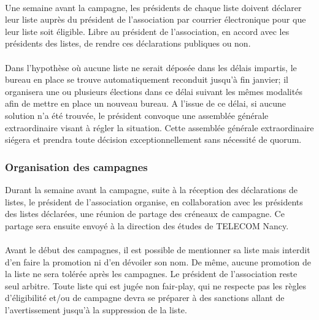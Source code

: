 \documentclass{article} %
\begin{document}
                \paragraph{}
				Une semaine avant la campagne, les présidents de chaque liste
				doivent déclarer leur liste auprès du président de l’association
				par courrier électronique pour que leur liste soit éligible.
				Libre au président de l’association, en accord avec les
				présidents des listes, de rendre ces déclarations publiques ou
				non.

                \paragraph{}
				Dans l’hypothèse où aucune liste ne serait déposée dans les
				délais impartis, le bureau en place se trouve automatiquement
				reconduit jusqu’à fin janvier; il organisera une ou plusieurs
				élections dans ce délai suivant les mêmes modalités afin de
				mettre en place un nouveau bureau. A l’issue de ce délai, si
				aucune solution n’a été trouvée, le président convoque une
				assemblée générale extraordinaire visant à régler la situation.
				Cette assemblée générale extraordinaire siégera et prendra toute
				décision exceptionnellement sans nécessité de quorum.

			\subsubsection{Organisation des campagnes}
\label{ssub:organisation_des_campagnes}

				Durant la semaine avant la campagne, suite à la réception des
				déclarations de listes, le président de l’association organise,
				en collaboration avec les présidents des listes déclarées, une
				réunion de partage des créneaux de campagne. Ce partage sera
				ensuite envoyé à la direction des études de TELECOM Nancy.

                \paragraph{}
				Avant le début des campagnes, il est possible de mentionner sa
				liste mais interdit d’en faire la promotion ni d'en dévoiler son
				nom. De même, aucune promotion de la liste ne sera tolérée après
				les campagnes. Le président de l’association reste seul arbitre.
				Toute liste qui est jugée non fair-play, qui ne respecte pas les
				règles d’éligibilité et/ou de campagne devra se préparer à des
				sanctions allant de l’avertissement jusqu'à la suppression de la
				liste.
\end{document}
